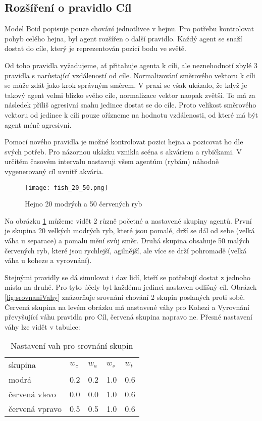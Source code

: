 \subsection{Rozšíření o pravidlo Cíl}
Model Boid popisuje pouze chování jednotlivce v hejnu. Pro potřebu kontrolovat pohyb celého hejna, byl agent rozšířen o další pravidlo. Každý agent se snaží dostat do cíle, který je reprezentován pozicí bodu ve světě. 
\par
Od toho pravidla vyžadujeme, ať přitahuje agenta k cíli, ale neznehodnotí zbylé 3 pravidla s narůstající vzdáleností od cíle. Normalizování směrového vektoru k cíli se může zdát jako krok správným směrem. V praxi se však ukázalo, že když je takový agent velmi blízko svého cíle, normalizace vektor naopak zvětší. To má za následek příliš agresivní snahu jedince dostat se do cíle. Proto velikost směrového vektoru od jedince k cíli pouze ořízneme na hodnotu vzdálenosti, od které má být agent méně agresivní. 
\par
Pomocí nového pravidla je možné kontrolovat pozici hejna a pozicovat ho dle svých potřeb. Pro názornou ukázku vznikla scéna s akváriem a rybičkami. V určitém časovém intervalu nastavuji všem agentům (rybám) náhodně vygenerovaný cíl uvnitř akvária.  
\begin{figure}[H]
	\texttt{[image: fish\_20\_50.png]}
	\centering
	\caption{Hejno 20 modrých a 50 červených ryb}
	\label{fig:ryby2050}
\end{figure}
Na obrázku \ref{fig:ryby2050} můžeme vidět 2 různě početné a nastavené skupiny agentů. První je skupina 20 velkých modrých ryb, které jsou pomalé, drží se dál od sebe (velká váha u separace) a pomalu mění svůj směr. Druhá skupina obsahuje 50 malých červených ryb, které jsou rychlejší, agilnější, ale více se drží pohromadě (velká váha u koheze a vyrovnání). 
\par
Stejnými pravidly se dá simulovat i dav lidí, kteří se potřebují dostat z jednoho místa na druhé. Pro tyto účely byl každému jedinci nastaven odlišný cíl. Obrázek \ref{fig:srovnaniVahy} znázorňuje srovnání chování 2 skupin poslaných proti sobě. Červená skupina na levém obrázku má nastavené váhy pro Kohezi a Vyrovnání převyšující váhu pravidla pro Cíl, červená skupina napravo ne. Přesné nastavení váhy lze vidět v tabulce: 
\begin{table}[H]
\centering
\label{tableSrovnani}
\caption{Nastavení vah pro srovnání skupin}
\begin{tabular}{lllll}
skupina         & $w_c$  & $w_a$  & $w_s$  & $w_t$ \\
modrá           & 0.2  & 0.2  & 1.0  & 0.6 \\
červená vlevo   & 0.0  & 0.0  & 1.0  & 0.6 \\
červená vpravo  & 0.5  & 0.5  & 1.0  & 0.6  
\end{tabular}
\end{table}
